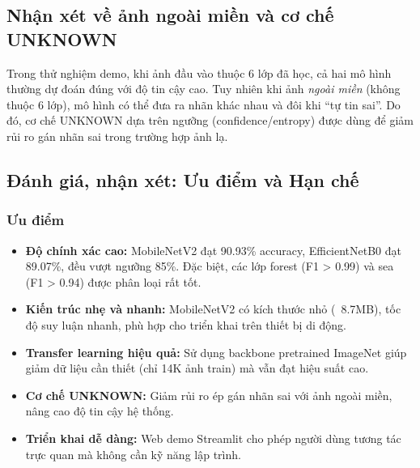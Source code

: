 \documentclass[12pt,a4paper]{article}
\begin{document}
\FloatBarrier

\subsection{Nhận xét về ảnh ngoài miền và cơ chế UNKNOWN}
Trong thử nghiệm demo, khi ảnh đầu vào thuộc 6 lớp đã học, cả hai mô hình thường dự đoán đúng với độ tin cậy cao. Tuy nhiên khi ảnh \emph{ngoài miền} (không thuộc 6 lớp), mô hình có thể đưa ra nhãn khác nhau và đôi khi ``tự tin sai''. Do đó, cơ chế UNKNOWN dựa trên ngưỡng (confidence/entropy) được dùng để giảm rủi ro gán nhãn sai trong trường hợp ảnh lạ.

\subsection{Đánh giá, nhận xét: Ưu điểm và Hạn chế}

\subsubsection{Ưu điểm}
\begin{itemize}
    \item \textbf{Độ chính xác cao:} MobileNetV2 đạt 90.93\% accuracy, EfficientNetB0 đạt 89.07\%, đều vượt ngưỡng 85\%. Đặc biệt, các lớp forest (F1 > 0.99) và sea (F1 > 0.94) được phân loại rất tốt.
    
    \item \textbf{Kiến trúc nhẹ và nhanh:} MobileNetV2 có kích thước nhỏ (~8.7MB), tốc độ suy luận nhanh, phù hợp cho triển khai trên thiết bị di động.
    
    \item \textbf{Transfer learning hiệu quả:} Sử dụng backbone pretrained ImageNet giúp giảm dữ liệu cần thiết (chỉ 14K ảnh train) mà vẫn đạt hiệu suất cao.
    
    \item \textbf{Cơ chế UNKNOWN:} Giảm rủi ro ép gán nhãn sai với ảnh ngoài miền, nâng cao độ tin cậy hệ thống.
    
    \item \textbf{Triển khai dễ dàng:} Web demo Streamlit cho phép người dùng tương tác trực quan mà không cần kỹ năng lập trình.
\end{itemize}
\end{document}
